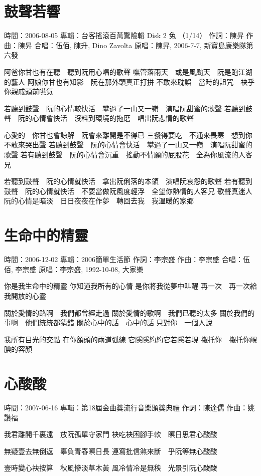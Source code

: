 \documentclass[UTF8,a4paper,oneside,twocolumn,12pt]{ctexbook}
\newcommand{\infopair}[2]{\textbullet #1：#2}
\newcommand{\zc}[1][伍佰]{\infopair{作詞}{#1}}
\newcommand{\zq}[1][伍佰]{\infopair{作曲}{#1}}
\newcommand{\zj}[1]{\infopair{專輯}{#1}}
\newcommand{\yc}[1]{\infopair{原唱}{#1}}
\newcommand{\sj}[1]{\infopair{時間}{#1}}
\newenvironment{info}{\begin{flushleft}\kaishu
	}
	{\end{flushleft}\normalsize\yahei\par}
\newenvironment{lyric}{
	}
{}
\begin{document}
\section{鼓聲若響}
\begin{info}
	\sj{2006-08-05}
	\zj{台客搖滾百萬驚險輯 Disk 2 兔 （1/14）}
	\zc[陳昇]
	\zq[陳昇]
	\infopair{合唱}{伍佰, 陳升, Dino Zavolta}
	\yc{陳昇, 2006-7-7, 新寶島康樂隊第六發}
\end{info}
\begin{lyric}
	阿爸你甘也有在聽　聽到阮用心唱的歌聲
	嘸管落雨天　或是風颱天　阮是跑江湖的藝人
	阿娘你甘也有知影　阮在那外頭真正打拼
	不敢來耽誤　當時的詛咒　袂乎你親戚頭前嚥氣

	若聽到鼓聲　阮的心情較快活　攀過了一山又一嶺　演唱阮甜蜜的歌聲
	若聽到鼓聲　阮的心情會快活　沒料到環境的拖磨　唱出阮悲情的歌聲

	心愛的　你甘也會諒解　阮會來離開是不得已
	三餐得要吃　不通來畏寒　想到你不敢來哭出聲
	若聽到鼓聲　阮的心情會快活　攀過了一山又一嶺　演唱阮甜蜜的歌聲
	若有聽到鼓聲　阮的心情會沉重　搖動不情願的屁股花　全為你風流的人客兄

	若聽到鼓聲　阮的心情就快活　拿出阮俐落的本領　演唱阮哀怨的歌聲
	若有聽到鼓聲　阮的心情就快活　不要當做阮風度輕浮　全望你熱情的人客兄
	歌聲真迷人　阮的心情是暗淡　日日夜夜在作夢　轉回去我　我溫暖的家鄉
\end{lyric}

\section{生命中的精靈}
\begin{info}
	\sj{2006-12-02}
	\zj{2006簡單生活節}
	\zc[李宗盛]
	\zq[李宗盛]
	\infopair{合唱}{伍佰, 李宗盛}
	\yc{李宗盛, 1992-10-08, 大家樂}
\end{info}
\begin{lyric}
	你是我生命中的精靈
	你知道我所有的心情
	是你將我從夢中叫醒
	再一次　再一次給我開放的心靈

	關於愛情的路啊　我們都曾經走過
	關於愛情的歌啊　我們已聽的太多
	關於我們的事啊　他們統統都猜錯
	關於心中的話　心中的話
	只對你　一個人說

	我所有目光的交點
	在你額頭的兩道弧線
	它隱隱約約它若隱若現
	襯托你　襯托你靦腆的容顏
\end{lyric}

\section{心酸酸}
\begin{info}
	\sj{2007-06-16}
	\zj{第18屆金曲獎流行音樂頒獎典禮}
	\zc[陳達儒]
	\zq[姚讚福]
\end{info}
\begin{lyric}
	我君離開千裏遠　放阮孤單守家門
	袂吃袂困腳手軟　瞑日思君心酸酸

	無疑壹去無倒返　辜負青春暝日長
	連寫批信煞來斷　乎阮等無心酸酸

	壹時變心袂按算　秋風慘淡草木黃
	風冷情冷是無秧　光景引阮心酸酸
\end{lyric}
\end{document}
